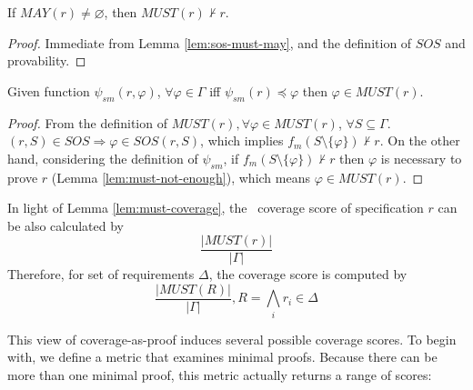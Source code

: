 \begin{lemma}
  \label{lem:must-not-enough}
  If $MAY(r) \neq \varnothing$, then $MUST(r) \nvdash r$.
\end{lemma}
\begin{proof}
 Immediate from Lemma \ref{lem:sos-must-may}, and the definition of $SOS$ and provability.
\end{proof}
\vspace{2mm}

\begin{lemma}
  \label{lem:must-coverage}
  Given function $\psi_{sm}(r, \varphi)$, $\forall \varphi \in \Gamma$ iff
  $\psi_{sm} (r) \preccurlyeq \varphi$ then  $\varphi \in MUST(r)$.

\end{lemma}
\begin{proof}
 From the definition of $MUST(r), \forall \varphi \in MUST (r)$, $\forall S \subseteq \Gamma$. $(r, S) \in SOS \Rightarrow \varphi \in SOS(r, S)$,
 which implies $f_m (S \setminus \{ \varphi \}) \nvdash r$.
 On the other hand, considering the definition of $\psi_{sm}$, if
 $f_m (S \setminus \{ \varphi \}) \nvdash r$ then $\varphi$ is necessary to prove $r$ (Lemma \ref{lem:must-not-enough}), which means $\varphi \in MUST(r)$.
\end{proof}
\vspace{2mm}



In light of Lemma \ref{lem:must-coverage}, the \nondetcov\ coverage score of specification $r$ can be also calculated by
$$\frac{|MUST(r)|}{|\Gamma|}$$
Therefore, for set of requirements $\Delta$, the coverage score is computed by $$\frac{|MUST(R)|}{|\Gamma|},\xspace  R = \bigwedge_{i} {r_i \in \Delta}$$

\vspace{0.2in}


This view of coverage-as-proof induces several possible coverage scores.  To begin with, we define a metric that examines minimal proofs.  Because 
there can be more than one minimal proof, this metric actually returns a range of scores: 

